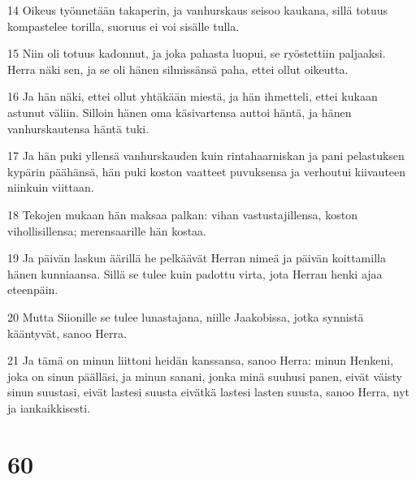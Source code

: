\par 14 Oikeus työnnetään takaperin, ja vanhurskaus seisoo kaukana, sillä totuus kompastelee torilla, suoruus ei voi sisälle tulla.
\par 15 Niin oli totuus kadonnut, ja joka pahasta luopui, se ryöstettiin paljaaksi. Herra näki sen, ja se oli hänen silmissänsä paha, ettei ollut oikeutta.
\par 16 Ja hän näki, ettei ollut yhtäkään miestä, ja hän ihmetteli, ettei kukaan astunut väliin. Silloin hänen oma käsivartensa auttoi häntä, ja hänen vanhurskautensa häntä tuki.
\par 17 Ja hän puki yllensä vanhurskauden kuin rintahaarniskan ja pani pelastuksen kypärin päähänsä, hän puki koston vaatteet puvuksensa ja verhoutui kiivauteen niinkuin viittaan.
\par 18 Tekojen mukaan hän maksaa palkan: vihan vastustajillensa, koston vihollisillensa; merensaarille hän kostaa.
\par 19 Ja päivän laskun äärillä he pelkäävät Herran nimeä ja päivän koittamilla hänen kunniaansa. Sillä se tulee kuin padottu virta, jota Herran henki ajaa eteenpäin.
\par 20 Mutta Siionille se tulee lunastajana, niille Jaakobissa, jotka synnistä kääntyvät, sanoo Herra.
\par 21 Ja tämä on minun liittoni heidän kanssansa, sanoo Herra: minun Henkeni, joka on sinun päälläsi, ja minun sanani, jonka minä suuhusi panen, eivät väisty sinun suustasi, eivät lastesi suusta eivätkä lastesi lasten suusta, sanoo Herra, nyt ja iankaikkisesti.

\chapter{60}

